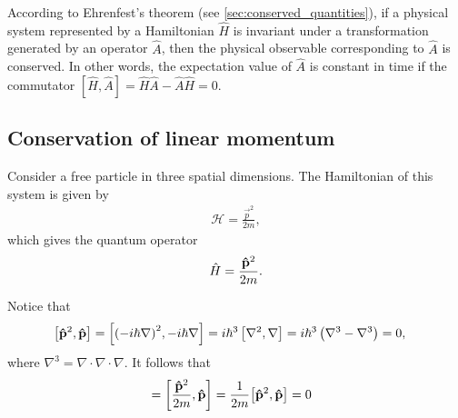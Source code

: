     According to Ehrenfest's theorem (see \cref{sec:conserved_quantities}), if a physical system represented by a Hamiltonian $\hat{H}$ is invariant under a transformation generated by an operator $\hat{A}$, then the physical observable corresponding to $\hat{A}$ is conserved. In other words, the expectation value of $\hat{A}$ is constant in time if the commutator $[\hat{H},\hat{A}] = \hat{H}\hat{A} - \hat{A}\hat{H} = 0$.
    
    \subsection{Conservation of linear momentum}
    Consider a free particle in three spatial dimensions. The Hamiltonian of this system is given by
    \begin{align*}
        \mathcal{H} = \frac{\vec{p}^2}{2m},
    \end{align*}
    which gives the quantum operator
    \begin{align*}
        \hat{H} = \frac{\mathbf{\hat{p}}^2}{2m}.
    \end{align*}
    
    Notice that
    \begin{align*}
        \left[ \mathbf{\hat{p}}^2, \mathbf{\hat{p}} \right] &= \left[ {\left( -i\hbar \nabla \right)}^2, -i\hbar \nabla \right] = i\hbar^3 \left[ \nabla^2, \nabla \right] = i\hbar^3 \left( \nabla^3 - \nabla^3 \right) = 0,
    \end{align*}
    where $\nabla^3 = \nabla\cdot\nabla\cdot\nabla$.
    It follows that
    \begin{align*}
        [\hat{H},\vh{p}]
            &= \left[\frac{\vh{p}^2}{2m},\vh{p}\right] = \frac{1}{2m}{\left[\vh{p}^2,\vh{p}\right]} = 0
    \end{align*}

